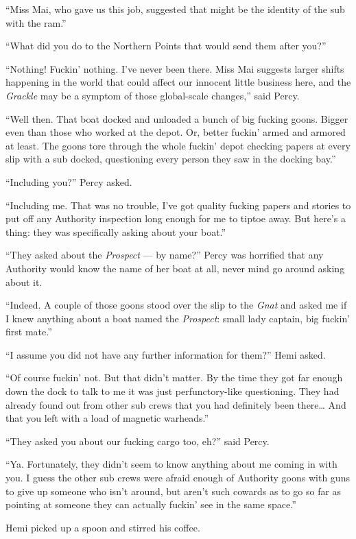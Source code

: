 \documentclass[
]{scrbook}
\begin{document}
``Miss Mai, who gave us this job, suggested that might be the identity
of the sub with the ram.''

``What did you do to the Northern Points that would send them after
you?''

``Nothing! Fuckin' nothing. I've never been there. Miss Mai suggests
larger shifts happening in the world that could affect our innocent
little business here, and the \emph{Grackle} may be a symptom of those
global-scale changes,'' said Percy.

``Well then. That boat docked and unloaded a bunch of big fucking goons.
Bigger even than those who worked at the depot. Or, better fuckin' armed
and armored at least. The goons tore through the whole fuckin' depot
checking papers at every slip with a sub docked, questioning every
person they saw in the docking bay.''

``Including you?'' Percy asked.

``Including me. That was no trouble, I've got quality fucking papers and
stories to put off any Authority inspection long enough for me to tiptoe
away. But here's a thing: they was specifically asking about your
boat.''

``They asked about the \emph{Prospect} --- by name?'' Percy was
horrified that any Authority would know the name of her boat at all,
never mind go around asking about it.

``Indeed. A couple of those goons stood over the slip to the \emph{Gnat}
and asked me if I knew anything about a boat named the \emph{Prospect}:
small lady captain, big fuckin' first mate.''

``I assume you did not have any further information for them?'' Hemi
asked.

``Of course fuckin' not. But that didn't matter. By the time they got
far enough down the dock to talk to me it was just perfunctory-like
questioning. They had already found out from other sub crews that you
had definitely been there\ldots{} And that you left with a load of
magnetic warheads.''

``They asked you about our fucking cargo too, eh?'' said Percy.

``Ya. Fortunately, they didn't seem to know anything about me coming in
with you. I guess the other sub crews were afraid enough of Authority
goons with guns to give up someone who isn't around, but aren't such
cowards as to go so far as pointing at someone they can actually fuckin'
see in the same space.''

Hemi picked up a spoon and stirred his coffee.
\end{document}

